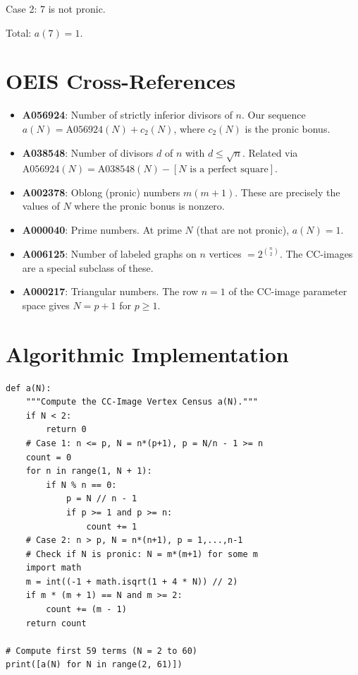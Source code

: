 \documentclass[11pt,a4paper]{article}
\theoremstyle{definition}
\begin{document}
Case 2: 7 is not pronic.

Total: $a(7) = 1$.

\section{OEIS Cross-References}

\begin{itemize}
\item \textbf{A056924}: Number of strictly inferior divisors of $n$. Our sequence $a(N) = \mathrm{A056924}(N) + c_2(N)$, where $c_2(N)$ is the pronic bonus.
\item \textbf{A038548}: Number of divisors $d$ of $n$ with $d \leq \sqrt{n}$. Related via $\mathrm{A056924}(N) = \mathrm{A038548}(N) - [N \text{ is a perfect square}]$.
\item \textbf{A002378}: Oblong (pronic) numbers $m(m+1)$. These are precisely the values of $N$ where the pronic bonus is nonzero.
\item \textbf{A000040}: Prime numbers. At prime $N$ (that are not pronic), $a(N) = 1$.
\item \textbf{A006125}: Number of labeled graphs on $n$ vertices $= 2^{\binom{n}{2}}$. The CC-images are a special subclass of these.
\item \textbf{A000217}: Triangular numbers. The row $n = 1$ of the CC-image parameter space gives $N = p + 1$ for $p \geq 1$.
\end{itemize}

\section{Algorithmic Implementation}

\begin{verbatim}
def a(N):
    """Compute the CC-Image Vertex Census a(N)."""
    if N < 2:
        return 0
    # Case 1: n <= p, N = n*(p+1), p = N/n - 1 >= n
    count = 0
    for n in range(1, N + 1):
        if N % n == 0:
            p = N // n - 1
            if p >= 1 and p >= n:
                count += 1
    # Case 2: n > p, N = n*(n+1), p = 1,...,n-1
    # Check if N is pronic: N = m*(m+1) for some m
    import math
    m = int((-1 + math.isqrt(1 + 4 * N)) // 2)
    if m * (m + 1) == N and m >= 2:
        count += (m - 1)
    return count

# Compute first 59 terms (N = 2 to 60)
print([a(N) for N in range(2, 61)])
\end{verbatim}
\end{document}
